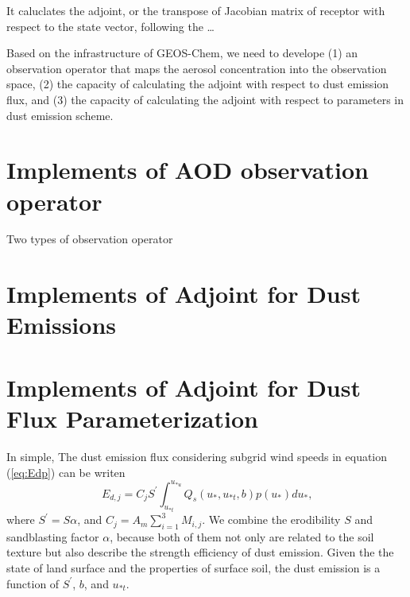  It caluclates the adjoint, or the transpose of Jacobian matrix of receptor with respect 
 to the state vector, following the \ldots

 Based on the infrastructure of GEOS-Chem, we need to develope (1) an observation operator 
 that maps the aerosol concentration into the observation space, (2) the capacity of 
 calculating the adjoint with respect to dust emission flux, and (3) the capacity of 
 calculating the adjoint with respect to parameters in dust emission scheme. 

\section{Implements of AOD observation operator}

Two types of observation operator

\section{Implements of Adjoint for Dust Emissions}
\section{Implements of Adjoint for Dust Flux Parameterization}

   In simple, The dust emission flux considering subgrid wind speeds in equation 
   (\ref{eq:Edp}) can be writen
   \begin{equation}
   E_{d,j} = C_j S^\prime \int^{u_{*u}}_{u_{*t}} Q_s(u_*,u_{*t},b) p(u_*) d u_* \mbox{,}
   \end{equation}
   where $S^\prime = S \alpha$, and $C_j=A_m \displaystyle \sum_{i=1}^3 M_{i,j}$. We combine
   the erodibility $S$ and sandblasting factor $\alpha$, because both of them not only are 
   related to the soil texture but also describe the strength efficiency of dust emission. 
   Given the the state of land surface and the properties of surface soil, the dust emission
   is a function of $S^\prime$, $b$, and $u_{*t}$. 

